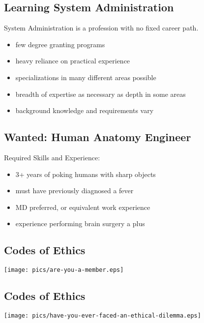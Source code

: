\documentclass[xga]{xdvislides}
\begin{document}
\subsection{Learning System Administration}
System Administration is a profession with no fixed career path.

\begin{itemize}
	\item few degree granting programs
	\item heavy reliance on practical experience
	\item specializations in many different areas possible
	\item breadth of expertise as necessary as depth in some areas
	\item background knowledge and requirements vary
\end{itemize}

\subsection{Wanted: Human Anatomy Engineer}
Required Skills and Experience:

\begin{itemize}
	\item 3+ years of poking humans with sharp objects
	\item must have previously diagnosed a fever
	\item MD preferred, or equivalent work experience
	\item experience performing brain surgery a plus
\end{itemize}

\subsection{Codes of Ethics}
\vspace*{\fill}
\begin{center}
	\texttt{[image: pics/are-you-a-member.eps]}
\end{center}
\vspace*{\fill}

\subsection{Codes of Ethics}
\vspace*{\fill}
\begin{center}
	\texttt{[image: pics/have-you-ever-faced-an-ethical-dilemma.eps]}
\end{center}
\vspace*{\fill}
\end{document}
